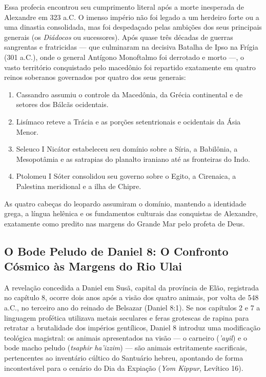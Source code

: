 \documentclass[11pt,a4paper,openany]{book}
\begin{document}
Essa profecia encontrou seu cumprimento literal após a morte inesperada de Alexandre em 323 a.C. O imenso império não foi legado a um herdeiro forte ou a uma dinastia consolidada, mas foi despedaçado pelas ambições dos seus principais generais (os \textit{Diádocos} ou sucessores). Após quase três décadas de guerras sangrentas e fratricidas — que culminaram na decisiva Batalha de Ipso na Frígia (301 a.C.), onde o general Antígono Monoftalmo foi derrotado e morto —, o vasto território conquistado pelo macedônio foi repartido exatamente em quatro reinos soberanos governados por quatro dos seus generais:
\begin{enumerate}
  \item Cassandro assumiu o controle da Macedônia, da Grécia continental e de setores dos Bálcãs ocidentais.
  \item Lisímaco reteve a Trácia e as porções setentrionais e ocidentais da Ásia Menor.
  \item Seleuco I Nicátor estabeleceu seu domínio sobre a Síria, a Babilônia, a Mesopotâmia e as satrapias do planalto iraniano até as fronteiras do Indo.
  \item Ptolomeu I Sóter consolidou seu governo sobre o Egito, a Cirenaica, a Palestina meridional e a ilha de Chipre.
\end{enumerate}


As quatro cabeças do leopardo assumiram o domínio, mantendo a identidade grega, a língua helênica e os fundamentos culturais das conquistas de Alexandre, exatamente como predito nas margens do Grande Mar pelo profeta de Deus.


\subsection{O Bode Peludo de Daniel 8: O Confronto Cósmico às Margens do Rio Ulai}


A revelação concedida a Daniel em Susã, capital da província de Elão, registrada no capítulo 8, ocorre dois anos após a visão dos quatro animais, por volta de 548 a.C., no terceiro ano do reinado de Belsazar (Daniel 8:1). Se nos capítulos 2 e 7 a linguagem profética utilizava metais seculares e feras grotescas de rapina para retratar a brutalidade dos impérios gentílicos, Daniel 8 introduz uma modificação teológica magistral: os animais apresentados na visão — o carneiro (\textit{'ayil}) e o bode macho peludo (\textit{tsaphir ha'izzim}) — são animais estritamente sacrificais, pertencentes ao inventário cúltico do Santuário hebreu, apontando de forma incontestável para o cenário do Dia da Expiação (\textit{Yom Kippur}, Levítico 16).
\end{document}

